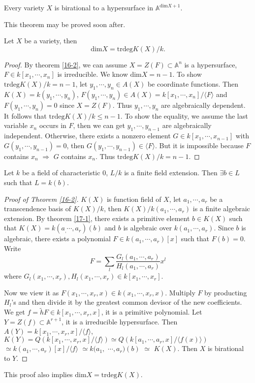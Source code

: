 \begin{theorem}\label{16-2}
	Every variety $ X $ is birational to a hypersurface in $ \mathbb{A}^{\mathrm{dim}X+1} $.
\end{theorem}
This theorem may be proved soon after.
\begin{theorem}
	Let $ X $ be a variety, then
	$$
		\mathrm{dim} X=\mathrm{trdeg} K(X)/k.
	$$
\end{theorem}
\begin{proof}
	By theorem \ref{16-2}, we can assume $ X=Z(F)\subset \mathbb{A}^n $ is a hypersurface, $ F\in k[x_1,\cdots,x_n] $ is irreducible. We know $ \mathrm{dim}X=n-1 $. To show $ \text{trdeg}K(X)/k=n-1 $, let $ y_1,\cdots,y_n\in A(X) $ be coordinate functions. Then $ K(X)=k(y_1,\cdots,y_n) $, $ F(y_1,\cdots,y_n)\in A(X)=k[x_1,\cdots,x_n]/\langle F \rangle $ and $ F(y_1,\cdots,y_n)=0 $ since $ X=Z(F) $. Thus $ y_1,\cdots,y_n $ are algebraically dependent. It follows that $ \text{trdeg}K(X)/k\leq n-1 $. To show the equality, we assume the last variable $ x_n $ occurs in $ F $, then we can get $ y_1,\cdots,y_{n-1} $ are algebraically independent. Otherwise, there exists a nonzero element $ G\in k[x_1,\cdots,x_{n-1}] $ with $ G(y_1,\cdots,y_{n-1})=0 $, then $ G(y_1,\cdots,y_{n-1})\in \langle F\rangle  $. But it is impossible because $ F $ contains $ x_n $ $ \Rightarrow $ $ G $ contains $ x_n $. Thus $ \text{trdeg}K(X)/k=n-1 $.
\end{proof}
\begin{theorem}\label{17-1}
	Let $ k $ be a field of characteristic $ 0 $, $ L/k $ is a finite field extension. Then $ \exists b\in L $ such that $ L=k(b) $.
\end{theorem}
\begin{proof}[Proof of Theorem \ref{16-2}]
	$ K(X) $ is function field of $ X $, let $ a_1,\cdots,a_r $ be a transcendence basis of $ K(X)/k $, then $ K(X)/k(a_1,\cdots,a_r) $ is a finite algebraic extension. By theorem  \ref{17-1}, there exists a primitive element $ b\in K(X) $ such that  $ K(X)=k(a_,\cdots,a_r)(b) $ and $ b $ is algebraic over $ k(a_1,\cdots,a_r) $. Since $ b $ is algebraic, there exists a polynomial $ F\in k(a_1,\cdots,a_r)[x] $ such that $ F(b)=0 $. Write
	$$
		F=\sum\limits_{l}\frac{G_l(a_1,\cdots,a_r)}{H_l(a_1,\cdots,a_r)}x^l
	$$
	where $ G_l(x_1,\cdots,x_r),H_l(x_1,\cdots,x_r)\in k[x_1,\cdots,x_r] $.

	Now we view it as $ F(x_1,\cdots,x_r,x)\in k(x_1,\cdots,x_r,x) $. Multiply $ F $ by producting $ H_l $'s and then  divide it by the greatest common devisor of the new coefficients. We get $ f=\tilde{h}F\in k[x_1,\cdots,x_r,x] $, it is a primitive polynomial. Let $ Y=Z(f)\subset \mathbb{A}^{r+1} $, it is a irreducible hypersurface. Then $ A(Y)=k[x_1,\cdots,x_r,x]/\langle f\rangle $, $ K(Y)=Q(k[x_1,\cdots,x_r,x]/\langle f\rangle)\simeq Q(k[a_1,\cdots,a_r,x]/\langle f(x) \rangle) $ $ \simeq k(a_1,\cdots,a_r)[x]/\langle f\rangle$ $\simeq k(a_1,$ $\cdots,a_r)(b) $ $ \simeq $ $ K(X) $. Then $ X $ is birational to $ Y $.
\end{proof}
This proof also implies $ \mathrm{dim}X=\mathrm{trdeg}K(X) $.

